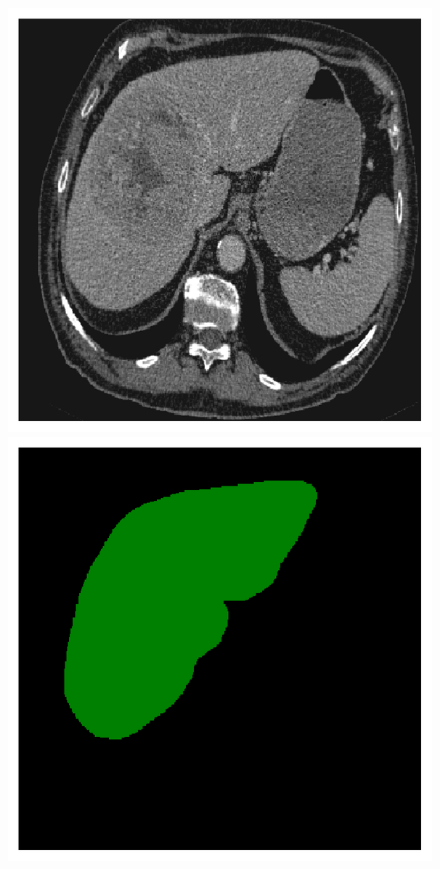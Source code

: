\begin{figure}[!ht]
	\centering
	\begin{minipage}{4cm}
		\includegraphics[width=\linewidth]{images/ResizeLiverVE_Raw_Pat1_12}
	\end{minipage} \hspace{-0.3cm}
	\begin{minipage}{4cm}
		\includegraphics[width=\linewidth]{images/ResizeLiverVE_GT_Pat1_12}

\end{minipage}
\end{figure}
